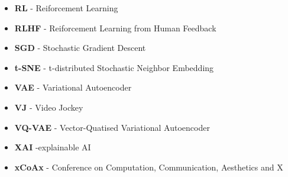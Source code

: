 \begin{itemize}
\item \textbf{RL} - Reiforcement Learning
\item \textbf{RLHF} - Reiforcement Learning from Human Feedback
\item \textbf{SGD} - Stochastic Gradient Descent
\item \textbf{t-SNE} - t-distributed Stochastic Neighbor Embedding
\item \textbf{VAE} - Variational Autoencoder
\item \textbf{VJ} - Video Jockey
\item \textbf{VQ-VAE} - Vector-Quatised Variational Autoencoder
\item \textbf{XAI} -explainable AI
\item \textbf{xCoAx} - Conference on Computation, Communication, Aesthetics and X
\end{itemize}